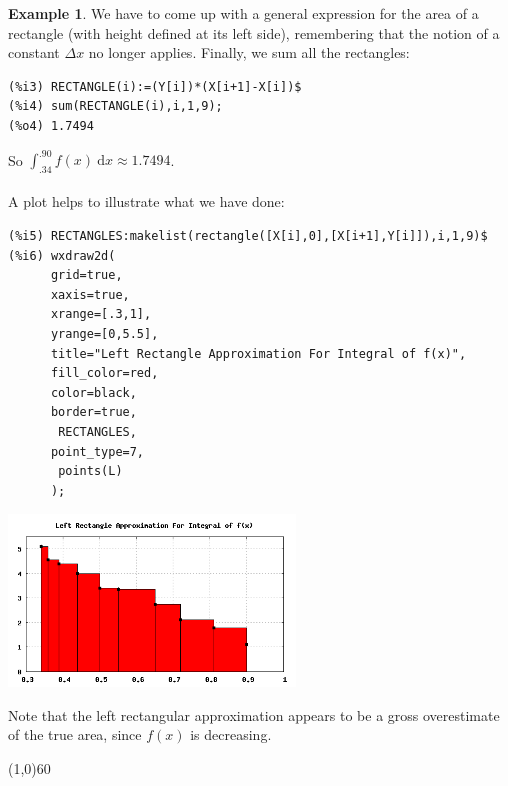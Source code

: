 \documentclass[10.5pt,twoside]{report}
\theoremstyle{definition}
\newtheorem{exmp}{Example}[section]
\begin{document}
\begin{exmp}
We have to come up with a general expression for the area of a rectangle (with height defined at its left side), remembering that the notion of a constant $\Delta x$ no longer applies.  Finally, we sum all the rectangles:

\begin{verbatim}
(%i3) RECTANGLE(i):=(Y[i])*(X[i+1]-X[i])$
(%i4) sum(RECTANGLE(i),i,1,9);
(%o4) 1.7494

\end{verbatim}

So $\displaystyle \int_{.34}^{.90} f(x) \ \mathrm{d}x \approx 1.7494$.\\
${}$\\

A plot helps to illustrate what we have done:

\begin{verbatim}
(%i5) RECTANGLES:makelist(rectangle([X[i],0],[X[i+1],Y[i]]),i,1,9)$
(%i6) wxdraw2d(
      grid=true,
      xaxis=true,
      xrange=[.3,1],
      yrange=[0,5.5],
      title="Left Rectangle Approximation For Integral of f(x)",
      fill_color=red,
      color=black,
      border=true,
       RECTANGLES,
      point_type=7,
       points(L)
      );
\end{verbatim}

\includegraphics[width=3in]{example_6_4_1_1}

Note that the left rectangular approximation appears to be a gross overestimate of the true area, since $f(x)$ is decreasing.


\end{exmp}

\line(1,0){60}
\linethickness{0.5mm}
\end{document}
